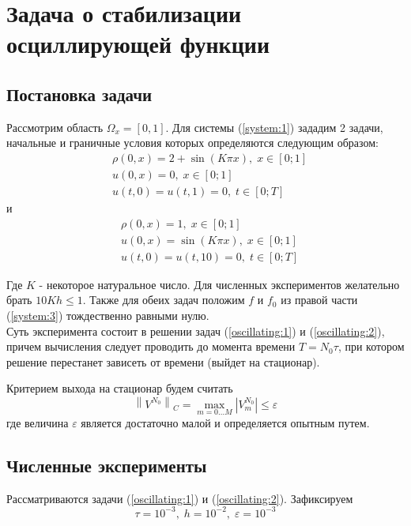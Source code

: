 \section{Задача о стабилизации осциллирующей функции}

\subsection{Постановка задачи}
Рассмотрим область $\Omega_x = [0,1]$. Для системы (\ref{system:1}) зададим 2 задачи, начальные и граничные условия которых определяются следующим образом:
\begin{equation}
\label{oscillating:1}
\begin{aligned}
  & \rho(0, x) = 2 + \sin (K \pi x), \; x \in [0; 1] \\
  & u(0, x) = 0, \; x \in [0; 1] \\
  & u(t, 0) = u(t, 1) = 0, \; t \in [0; T] 
\end{aligned}
\end{equation}
и
\begin{equation}
\label{oscillating:2}
\begin{aligned}
  & \rho(0, x)= 1, \; x \in [0; 1] \\
  & u(0, x) = \sin (K \pi x), \; x \in [0; 1] \\
  & u(t, 0) = u(t, 10) = 0, \; t \in [0; T] 
\end{aligned}
\end{equation}

Где $K$ - некоторое натуральное число. Для численных экспериментов желательно брать $10 K h \leq 1$. 
Также для обеих задач положим $f$ и $f_0$ из правой части (\ref{system:3}) тождественно равными нулю. \\

Суть эксперимента состоит в решении задач (\ref{oscillating:1}) и (\ref{oscillating:2}), причем вычисления следует проводить до момента времени $T = N_0 \tau$, при котором решение перестанет зависеть от времени (выйдет на стационар). 

Критерием выхода на стационар будем считать
$$
  \left\| V^{N_{0}} \right\|_C =
  \max_{m = 0 \dots M} \left| V_{m}^{N_{0}} \right| 
  \leq \varepsilon
$$
где величина $\varepsilon$ является достаточно малой и определяется опытным путем. \\


\newpage
\subsection{Численные эксперименты}
Рассматриваются задачи (\ref{oscillating:1}) и (\ref{oscillating:2}).
Зафиксируем $$ \tau = 10^{-3}, \; h = 10^{-2}, \; \varepsilon = 10^{-3}$$

